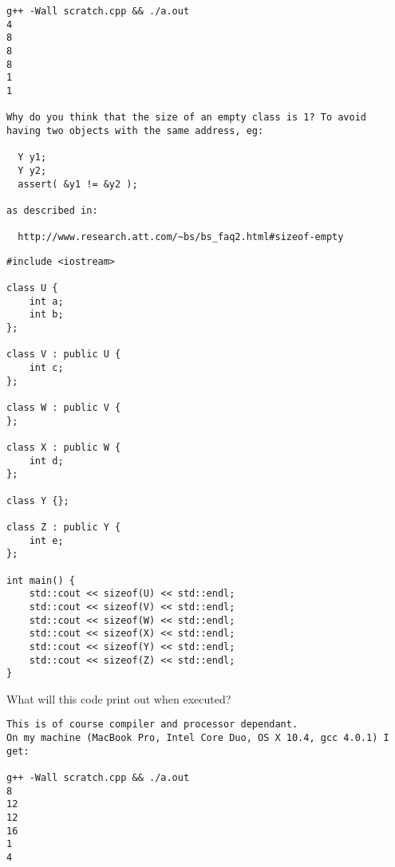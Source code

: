 \documentclass[landscape]{slides}
\begin{document}
\begin{slide}
\begin{note}
\begin{tiny}
\begin{verbatim}
g++ -Wall scratch.cpp && ./a.out
4
8
8
8
1
1

Why do you think that the size of an empty class is 1? To avoid
having two objects with the same address, eg:

  Y y1;
  Y y2;
  assert( &y1 != &y2 );

as described in:

  http://www.research.att.com/~bs/bs_faq2.html#sizeof-empty  

\end{verbatim}
\end{tiny}
\end{note}

\end{slide}


\begin{slide}
\begin{lstlisting}
#include <iostream>

class U {
    int a;
    int b;
};

class V : public U {
    int c;
};

class W : public V {
};

class X : public W {
    int d;
};

class Y {};

class Z : public Y {
    int e;
};

int main() {
    std::cout << sizeof(U) << std::endl;
    std::cout << sizeof(V) << std::endl;
    std::cout << sizeof(W) << std::endl;
    std::cout << sizeof(X) << std::endl;
    std::cout << sizeof(Y) << std::endl;
    std::cout << sizeof(Z) << std::endl;
}
\end{lstlisting}

What will this code print out when executed?

\begin{note}
\begin{tiny}
\begin{verbatim}
This is of course compiler and processor dependant. 
On my machine (MacBook Pro, Intel Core Duo, OS X 10.4, gcc 4.0.1) I get:

g++ -Wall scratch.cpp && ./a.out
8
12
12
16
1
4
\end{verbatim}
\end{tiny}
\end{note}

\end{slide}

\end{document}

